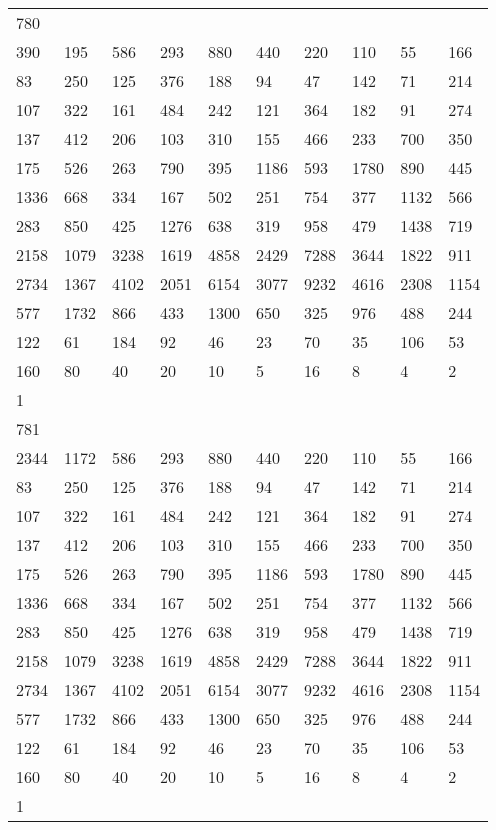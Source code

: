 \begin{longtable}{*{10}{l}}
780&&&&&&&&&\\
390& 195& 586& 293& 880& 440& 220& 110& 55& 166\\
83& 250& 125& 376& 188& 94& 47& 142& 71& 214\\
107& 322& 161& 484& 242& 121& 364& 182& 91& 274\\
137& 412& 206& 103& 310& 155& 466& 233& 700& 350\\
175& 526& 263& 790& 395& 1186& 593& 1780& 890& 445\\
1336& 668& 334& 167& 502& 251& 754& 377& 1132& 566\\
283& 850& 425& 1276& 638& 319& 958& 479& 1438& 719\\
2158& 1079& 3238& 1619& 4858& 2429& 7288& 3644& 1822& 911\\
2734& 1367& 4102& 2051& 6154& 3077& 9232& 4616& 2308& 1154\\
577& 1732& 866& 433& 1300& 650& 325& 976& 488& 244\\
122& 61& 184& 92& 46& 23& 70& 35& 106& 53\\
160& 80& 40& 20& 10& 5& 16& 8& 4& 2\\
1& \\

781&&&&&&&&&\\
2344& 1172& 586& 293& 880& 440& 220& 110& 55& 166\\
83& 250& 125& 376& 188& 94& 47& 142& 71& 214\\
107& 322& 161& 484& 242& 121& 364& 182& 91& 274\\
137& 412& 206& 103& 310& 155& 466& 233& 700& 350\\
175& 526& 263& 790& 395& 1186& 593& 1780& 890& 445\\
1336& 668& 334& 167& 502& 251& 754& 377& 1132& 566\\
283& 850& 425& 1276& 638& 319& 958& 479& 1438& 719\\
2158& 1079& 3238& 1619& 4858& 2429& 7288& 3644& 1822& 911\\
2734& 1367& 4102& 2051& 6154& 3077& 9232& 4616& 2308& 1154\\
577& 1732& 866& 433& 1300& 650& 325& 976& 488& 244\\
122& 61& 184& 92& 46& 23& 70& 35& 106& 53\\
160& 80& 40& 20& 10& 5& 16& 8& 4& 2\\
1& \\


\end{longtable}
